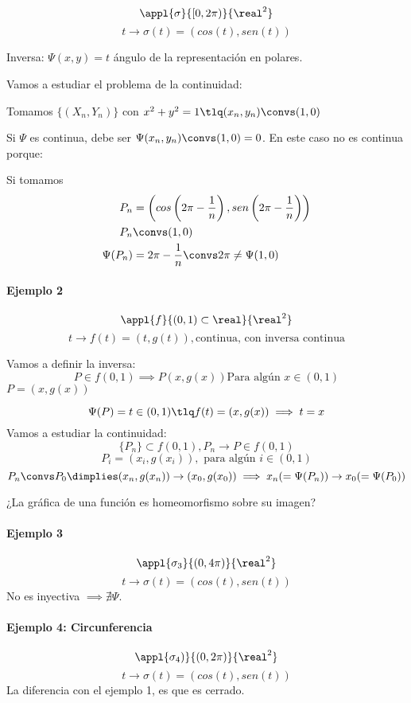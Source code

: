 \[\appl{\sigma}{[0,2\pi)}{\real^2}\]
\[t \rightarrow \sigma(t) = (cos(t),sen(t))\]

Inversa: $\Psi(x,y) = t$ ángulo de la representación en polares.

Vamos a estudiar el problema de la continuidad:

Tomamos $\{(X_n,Y_n)\}$ con $x^2+y^2 = 1 \tlq (x_n,y_n) \convs (1,0)$

Si $\Psi$ es continua, debe ser $\Psi(x_n,y_n) \convs (1,0) = 0$. En este caso no es continua porque:

Si tomamos \begin{align*}
P_n &= \left(cos\left(2\pi - \frac{1}{n}\right), sen\left(2\pi - \frac{1}{n}\right) \right)\\
P_n &\convs (1,0)\\
\Psi(P_n) &= 2\pi - \frac{1}{n} \convs 2\pi\neq\Psi(1,0)
\end{align*}

\paragraph{Ejemplo 2}

\[\appl{f}{(0,1)\subset\real}{\real^2}\]
\[t \rightarrow f(t) = (t,g(t)), \text{continua, con inversa continua}\]

Vamos a definir la  inversa:
\[P\in f(0,1) \implies P(x,g(x)) \text{Para algún } x\in(0,1)\]
$P = (x,g(x))$

\[\Psi(P) = t \in (0,1) \tlq f(t) = (x,g(x)) \implies t = x\]
Vamos a estudiar la continuidad:
\[\{P_n\} \subset f(0,1), P_n \rightarrow P \in f(0,1)\]
\[P_i = (x_i,g(x_i)), \text{ para algún } i \in (0,1)\]
\[P_n \convs P_0 \dimplies (x_n,g(x_n)) \rightarrow (x_0,g(x_0)) \implies x_n (= \Psi(P_n)) \rightarrow x_0 (=\Psi(P_0)) \]

\obs ¿La gráfica de una función es homeomorfismo sobre su imagen?
\paragraph{Ejemplo 3}
\[\appl{\sigma_3}{(0,4\pi)}{\real^2}\]
\[t \rightarrow \sigma(t) = (cos(t),sen(t))\]
No es inyectiva $\implies \nexists \Psi$.

\paragraph{Ejemplo 4: Circunferencia}
\[\appl{\sigma_4)}{(0,2\pi)}{\real^2}\]
\[t \rightarrow \sigma(t) = (cos(t),sen(t))\]
La diferencia con el ejemplo 1, es que es cerrado.

